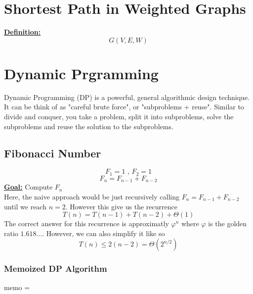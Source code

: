 \documentclass[a4paper]{article}
\renewcommand{\sb}{\vspace*{4px} \\}
\begin{document}
\section{Shortest Path in Weighted Graphs}
\underline{\textbf{Definition:}}
\[ G(V, E, W) \]

\section{Dynamic Prgramming} 
Dynamic Programming (DP) is a powerful, general algorithmic design technique. 
It can be think of as "careful brute force", or "subproblems + reuse". Similar 
to divide and conquer, you take a problem, split it into subproblems, solve the 
subproblems and reuse the solution to the subproblems.
\subsection{Fibonacci Number}
\[ F_1 = 1 \text{ , } F_2 = 1 \]
\[ F_n = F_{n-1} + F_{n-2} \]
\underline{\textbf{Goal:}} Compute $F_n$ \sb
Here, the naive approach would be just recursively calling $F_n = F_{n-1} + F_{n-2}$ 
until we reach $n=2$. However this give us the recurrence
\[ T(n) = T(n-1) + T(n-2) + \Theta(1) \]
The correct answer for this recurrence is approximatly $\varphi^n$ where $\varphi$ 
is the golden ratio $1.618\dots$. However, we can also simplify it like so
\[ T(n) \le 2(n-2) = \Theta(2^{n/2}) \]
\subsubsection*{Memoized DP Algorithm}
memo = {}
        
\end{document}
